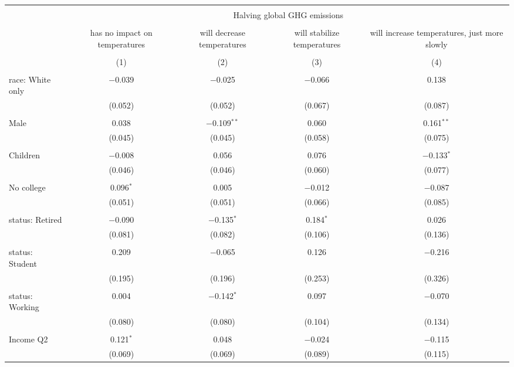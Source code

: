 
\begin{tabular}{@{\extracolsep{5pt}}lcccc} 
\\[-1.8ex]\hline 
\hline \\[-1.8ex] 
 & \multicolumn{4}{c}{Halving global GHG emissions} \\ 
\cline{2-5} 
\\[-1.8ex] & has no impact on temperatures & will decrease temperatures & will stabilize temperatures & will increase temperatures, just more slowly \\ 
\\[-1.8ex] & (1) & (2) & (3) & (4)\\ 
\hline \\[-1.8ex] 
 race: White only & $-$0.039 & $-$0.025 & $-$0.066 & 0.138 \\ 
  & (0.052) & (0.052) & (0.067) & (0.087) \\ 
  & & & & \\ 
 Male & 0.038 & $-$0.109$^{**}$ & 0.060 & 0.161$^{**}$ \\ 
  & (0.045) & (0.045) & (0.058) & (0.075) \\ 
  & & & & \\ 
 Children & $-$0.008 & 0.056 & 0.076 & $-$0.133$^{*}$ \\ 
  & (0.046) & (0.046) & (0.060) & (0.077) \\ 
  & & & & \\ 
 No college & 0.096$^{*}$ & 0.005 & $-$0.012 & $-$0.087 \\ 
  & (0.051) & (0.051) & (0.066) & (0.085) \\ 
  & & & & \\ 
 status: Retired & $-$0.090 & $-$0.135$^{*}$ & 0.184$^{*}$ & 0.026 \\ 
  & (0.081) & (0.082) & (0.106) & (0.136) \\ 
  & & & & \\ 
 status: Student & 0.209 & $-$0.065 & 0.126 & $-$0.216 \\ 
  & (0.195) & (0.196) & (0.253) & (0.326) \\ 
  & & & & \\ 
 status: Working & 0.004 & $-$0.142$^{*}$ & 0.097 & $-$0.070 \\ 
  & (0.080) & (0.080) & (0.104) & (0.134) \\ 
  & & & & \\ 
 Income Q2 & 0.121$^{*}$ & 0.048 & $-$0.024 & $-$0.115 \\ 
  & (0.069) & (0.069) & (0.089) & (0.115) \\ 

\end{tabular}
